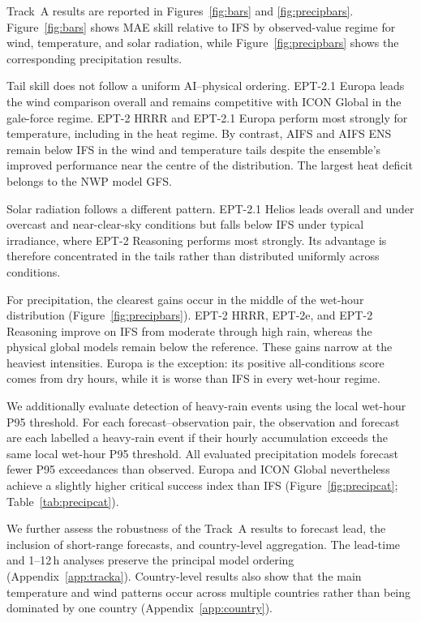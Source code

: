 \documentclass{article}
\begin{document}
Track~A results are reported in Figures~\ref{fig:bars} and
\ref{fig:precipbars}. Figure~\ref{fig:bars} shows MAE skill relative to IFS
by observed-value regime for wind, temperature, and solar radiation, while
Figure~\ref{fig:precipbars} shows the corresponding precipitation results.

Tail skill does not follow a uniform AI--physical ordering. EPT-2.1 Europa
leads the wind comparison overall and remains competitive with ICON Global
in the gale-force regime. EPT-2 HRRR and EPT-2.1 Europa perform most strongly
for temperature, including in the heat regime. By contrast, AIFS and AIFS ENS
remain below IFS in the wind and temperature tails despite the ensemble's
improved performance near the centre of the distribution. The largest heat
deficit belongs to the NWP model GFS.

Solar radiation follows a different pattern. EPT-2.1 Helios leads overall
and under overcast and near-clear-sky conditions but falls below IFS under
typical irradiance, where EPT-2 Reasoning performs most strongly. Its
advantage is therefore concentrated in the tails rather than distributed
uniformly across conditions.

For precipitation, the clearest gains occur in the middle of the wet-hour
distribution (Figure~\ref{fig:precipbars}). EPT-2 HRRR, EPT-2e, and
EPT-2 Reasoning improve on IFS from moderate through high rain, whereas the
physical global models remain below the reference. These gains narrow at the
heaviest intensities. Europa is the exception: its positive all-conditions
score comes from dry hours, while it is worse than IFS in every wet-hour
regime.

We additionally evaluate detection of heavy-rain events using the local
wet-hour P95 threshold. For each forecast--observation pair, the observation
and forecast are each labelled a heavy-rain event if their hourly
accumulation exceeds the same local wet-hour P95 threshold. All evaluated
precipitation models forecast fewer P95 exceedances than observed. Europa
and ICON Global nevertheless achieve a slightly higher critical success
index than IFS (Figure~\ref{fig:precipcat};
Table~\ref{tab:precipcat}).

We further assess the robustness of the Track~A results to forecast lead,
the inclusion of short-range forecasts, and country-level aggregation. The
lead-time and 1--12\,h analyses preserve the principal model ordering
(Appendix~\ref{app:tracka}). Country-level results also show that the main
temperature and wind patterns occur across multiple countries rather than
being dominated by one country (Appendix~\ref{app:country}).
\end{document}
